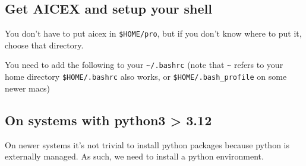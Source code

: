 \subsection{Get AICEX and setup your
shell}\label{get-aicex-and-setup-your-shell}

You don't have to put aicex in \texttt{\$HOME/pro}, but if you don't
know where to put it, choose that directory.

\begin{Shaded}
\begin{Highlighting}[]
\end{Highlighting}
\end{Shaded}

You need to add the following to your \texttt{\textasciitilde{}/.bashrc}
(note that \texttt{\textasciitilde{}} refers to your home directory
\texttt{\$HOME/.bashrc} also works, or \texttt{\$HOME/.bash\_profile} on
some newer macs)

\begin{Shaded}
\begin{Highlighting}[]
 \OperatorTok{=}
 \OperatorTok{=}
 \OperatorTok{=}
\end{Highlighting}
\end{Shaded}

\subsection{On systems with python3 \textgreater{}
3.12}\label{on-systems-with-python3-3.12}

On newer systems it's not trivial to install python packages because
python is externally managed. As such, we need to install a python
environment.

\begin{Shaded}
\begin{Highlighting}[]
 \NormalTok{:}
 
\end{Highlighting}
\end{Shaded}

